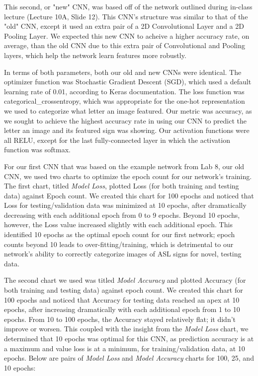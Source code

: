 \documentclass[11pt]{article}
\begin{document}
This second, or "new" CNN, was based off of the network outlined during in-class lecture (Lecture 10A, Slide 12). This CNN's structure was similar to that of the "old" CNN, except it used an extra pair of a 2D Convolutional Layer and a 2D Pooling Layer. We expected this new CNN to acheive a higher accuracy rate, on average, than the old CNN due to this extra pair of Convolutional and Pooling layers, which help the network learn features more robustly.

In terms of both parameters, both our old and new CNNs were identical. The optimizer function was Stochastic Gradient Descent (SGD), which used a default learning rate of 0.01, according to Keras documentation. The loss function was categorical\_crossentropy, which was appropriate for the one-hot representation we used to categorize what letter an image featured. Our metric was accuracy, as we sought to achieve the highest accuracy rate in using our CNN to predict the letter an image and its featured sign was showing. Our activation functions were all RELU, except for the last fully-connected layer in which the activation function was softmax.

For our first CNN that was based on the example network from Lab 8, our old CNN, we used two charts to optimize the epoch count for our network's training. The first chart, titled \textit{Model Loss}, plotted Loss (for both training and testing data) against Epoch count. We created this chart for 100 epochs and noticed that Loss for testing/validation data was minimized at 10 epochs, after dramatically decreasing with each additional epoch from 0 to 9 epochs. Beyond 10 epochs, however, the Loss value increased slightly with each additional epoch. This identified 10 epochs as the optimal epoch count for our first network; epoch counts beyond 10 leads to over-fitting/training, which is detrimental to our network's ability to correctly categorize images of ASL signs for novel, testing data.

The second chart we used was titled \textit{Model Accuracy} and plotted Accuracy (for both training and testing data) against epoch count. We created this chart for 100 epochs and noticed that Accuracy for testing data reached an apex at 10 epochs, after increasing dramatically with each additional epoch from 1 to 10 epochs. From 10 to 100 epochs, the Accuracy stayed relatively flat; it didn't improve or worsen. This coupled with the insight from the \textit{Model Loss} chart, we determined that 10 epochs was optimal for this CNN, as prediction accuracy is at a maximum and value loss is at a minimum, for training/validation data, at 10 epochs. Below are pairs of \textit{Model Loss} and \textit{Model Accuracy} charts for 100, 25, and 10 epochs:
\end{document}
